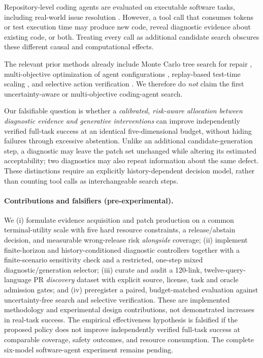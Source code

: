 \documentclass[pdflatex,sn-basic]{sn-jnl}
\begin{document}
Repository-level coding agents are evaluated on executable software tasks,
including real-world issue resolution \cite{jimenez2024swebench,yang2024sweagent}.
However, a tool call that consumes tokens or test execution time may produce
new code, reveal diagnostic evidence about existing code, or both. Treating
every call as additional candidate search obscures these different
causal and computational effects.

The relevant prior methods already include Monte Carlo tree search for repair
\cite{antoniades2025swesearch}, multi-objective optimization of agent
configurations \cite{gong2025ga4gc}, replay-based test-time scaling
\cite{ding2026swereplay}, and selective action verification
\cite{zou2026sweverifier}. We therefore do \emph{not} claim the first
uncertainty-aware or multi-objective coding-agent search.

Our falsifiable question is whether a \emph{calibrated, risk-aware
allocation between diagnostic evidence and generative interventions}
can improve independently verified full-task success at an identical
five-dimensional budget, without hiding failures through excessive
abstention. Unlike an additional candidate-generation step, a
diagnostic may leave the patch set unchanged while altering its
estimated acceptability; two diagnostics may also repeat information
about the same defect. These distinctions require an explicitly
history-dependent decision model, rather than counting tool calls as
interchangeable search steps.

\paragraph{Contributions and falsifiers (pre-experimental).}
We (i) formulate evidence acquisition and patch production on a
common terminal-utility scale with five hard resource constraints,
a release/abstain decision, and measurable wrong-release risk
\emph{alongside} coverage;
(ii) implement finite-horizon and history-conditioned diagnostic
controllers together with a finite-scenario sensitivity check and
a restricted, one-step mixed diagnostic/generation selector;
(iii) curate and audit a 120-link, twelve-query-language PR
\emph{discovery} dataset with explicit source, license, task and
oracle admission gates; and
(iv) preregister a paired, budget-matched evaluation against
uncertainty-free search and selective verification.
These are implemented methodology and experimental design
contributions, not demonstrated increases in real-task success.
The empirical effectiveness hypothesis is falsified if the proposed
policy does not improve independently verified full-task success
at comparable coverage, safety outcomes, and resource consumption.
The complete six-model software-agent experiment remains pending.
\end{document}
